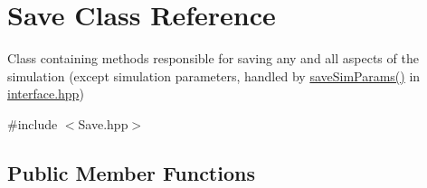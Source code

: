 \hypertarget{classSave}{}\section{Save Class Reference}
\label{classSave}


Class containing methods responsible for saving any and all aspects of the simulation (except simulation parameters, handled by \hyperlink{interface_8hpp_a573faab2db8e508d0a7189d2bd3fdb4d}{save\+Sim\+Params()} in \hyperlink{interface_8hpp}{interface.\+hpp})  




{\ttfamily \#include $<$Save.\+hpp$>$}

\subsection*{Public Member Functions}
